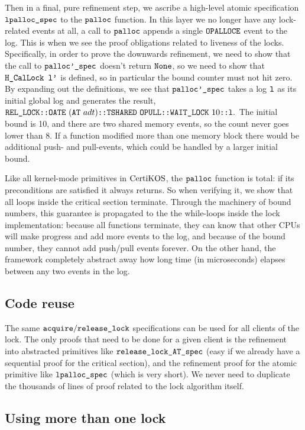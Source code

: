 Then in a final, pure refinement step, we ascribe a high-level atomic
specification ${\mathrm{\texttt{lpalloc\_spec}}}$ to the ${\mathrm{\texttt{palloc}}}$
function. In this layer we no longer have any lock-related events at
all, a call to ${\mathrm{\texttt{palloc}}}$ appends a single
${\mathrm{\texttt{OPALLOCE}}}$ event to the log. This is when we see the
proof obligations related to liveness of the locks.
Specifically, in order to prove the downwards refinement, we need to
show that the call to ${\mathrm{\texttt{palloc'\_spec}}}$ doesn't return
${\mathrm{\texttt{None}}}$, so we need to show that ${\mathrm{\texttt{H\_CalLock}}}{\mathrm{\texttt{ l'}}}$ is
defined, so in particular the bound counter must not hit zero.
By expanding out the definitions, we see that
${\mathrm{\texttt{palloc'\_spec}}}$ takes a log ${\mathrm{\texttt{l}}}$ as its initial global log
and generates the result,
$\rellock\codeinmath{::}\mcsoateev{(\mcsalloctable\ adt)}\codeinmath{::} \mcstshared{\mcsopullev}\codeinmath{::}\waitlock{10}\codeinmath{::l}.$
The initial bound is 10, and there are two shared memory events, so the
count never goes lower than 8. If a function modified more than one
memory block there would be additional push- and pull-events, which
could be handled by a larger initial bound.

Like all kernel-mode primitives in $\mathrm{CertiKOS}$, the ${\mathrm{\texttt{palloc}}}$ function is
total: if its preconditions are satisfied it always returns. So
when verifying it, we show that all loops inside the critical section
terminate. Through the machinery of bound numbers, this guarantee is
propagated to the the while-loops inside the lock implementation:
because all functions terminate, they can know that other CPUs will
make progress and add more events to the log, and because of the
bound number, they cannot add push/pull events forever. On the other
hand, the framework completely abstract away how long time (in microseconds) elapses
between any two events in the log.

\subsection{Code reuse} 
The same
${\mathrm{\texttt{acquire}}}/{\mathrm{\texttt{release\_lock}}}$ specifications can be
used for all clients of the lock. The only proofs that need to be done
for a given client is the refinement into abstracted primitives like
${\mathrm{\texttt{release\_lock\_AT\_spec}}}$ (easy if we already have a sequential
proof for the critical section), and the refinement proof for the
atomic primitive like ${\mathrm{\texttt{lpalloc\_spec}}}$ (which is very
short). We never need to duplicate the thousands of lines of proof
related to the lock algorithm itself.

\subsection{Using more than one lock}

